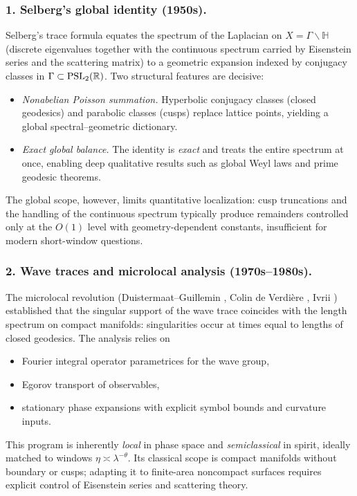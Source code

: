 \subsubsection*{1. Selberg’s global identity (1950s).}
Selberg’s trace formula \cite{Selberg1956} equates the spectrum of the Laplacian on
$X=\Gamma\backslash\mathbb{H}$ (discrete eigenvalues together with the continuous spectrum
carried by Eisenstein series and the scattering matrix) to a geometric expansion
indexed by conjugacy classes in $\Gamma\subset\operatorname{PSL}_2(\mathbb{R})$. Two structural
features are decisive:
\begin{itemize}
  \item \emph{Nonabelian Poisson summation.} Hyperbolic conjugacy classes (closed geodesics)
        and parabolic classes (cusps) replace lattice points, yielding a global spectral–geometric dictionary.
  \item \emph{Exact global balance.} The identity is \emph{exact} and treats the entire spectrum at once,
        enabling deep qualitative results such as global Weyl laws and prime geodesic theorems.
\end{itemize}
The global scope, however, limits quantitative localization: cusp truncations and the handling of the
continuous spectrum typically produce remainders controlled only at the $O(1)$ level with geometry-dependent constants,
insufficient for modern short-window questions.

\subsubsection*{2. Wave traces and microlocal analysis (1970s–1980s).}
The microlocal revolution (Duistermaat–Guillemin \cite{DG1975}, Colin de Verdière \cite{Colin1978}, Ivrii \cite{Ivrii1980})
established that the singular support of the wave trace coincides with the length spectrum on compact manifolds:
singularities occur at times equal to lengths of closed geodesics. The analysis relies on
\begin{itemize}
  \item Fourier integral operator parametrices for the wave group,
  \item Egorov transport of observables,
  \item stationary phase expansions with explicit symbol bounds and curvature inputs.
\end{itemize}
This program is inherently \emph{local} in phase space and \emph{semiclassical} in spirit, ideally matched to windows
$\eta\asymp\lambda^{-\theta}$. Its classical scope is compact manifolds without boundary or cusps; adapting it to
finite-area noncompact surfaces requires explicit control of Eisenstein series and scattering theory.

